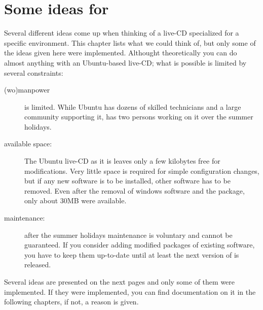 
\chapter{Some ideas for \tunix}
Several different ideas come up when thinking of a live-CD specialized for a
specific environment. This chapter lists what we could think of, but only some
of the ideas given here were implemented. Althought theoretically you can do
almost anything with an Ubuntu-based live-CD; what is possible is limited by
several constraints:
\begin{description}
 \item[(wo)manpower] is limited. While Ubuntu has dozens of skilled technicians and
   a large community supporting it, \tunix{} has two persons working on it over
   the summer holidays.
 \item[available space:] The Ubuntu live-CD as it is leaves only a few kilobytes
   free for modifications. Very little space is required for simple
   configuration changes, but if any new software is to be installed, other
   software has to be removed. Even after the removal of windows software and the
    package, only about 30MB were available.
 \item[maintenance:] after the summer holidays maintenance is voluntary and cannot be
   guaranteed. If you consider adding modified packages of existing software,
   you have to keep them up-to-date until at least the next version of \tunix{} is
   released.
\end{description}
Several ideas are presented on the next pages and only some of them were
implemented. If they were implemented, you can find documentation on it in the
following chapters, if not, a reason is given.
